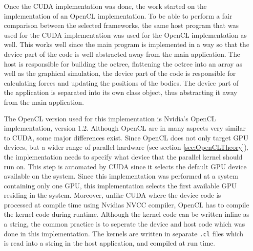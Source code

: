 Once the CUDA implementation was done, the work started on the implementation of an OpenCL implementation. To be able to perform a fair comparison between the selected frameworks, the same host program that was used for the CUDA implementation was used for the OpenCL implementation as well. This works well since the main program is implemented in a way so that the device part of the code is well abstracted away from the main application. The host is responsible for building the octree, flattening the octree into an array as well as the graphical simulation, the device part of the code is responsible for calculating forces and updating the positions of the bodies. The device part of the application is separated into its own class object, thus abstracting it away from the main application. 

The OpenCL version used for this implementation is Nvidia's OpenCL implementation, version 1.2.
Although OpenCL are in many aspects very similar to CUDA, some major differences exist. Since OpenCL does not only target GPU devices, but a wider range of parallel hardware (see section \ref{sec:OpenCLTheory}), the implementation needs to specify what device that the parallel kernel should run on. This step is automated by CUDA since it selects the default GPU device available on the system. Since this implementation was performed at a system containing only one GPU, this implementation selects the first available GPU residing in the system. Moreover, unlike CUDA where the device code is processed at compile time using Nvidias NVCC compiler, OpenCL has to compile the kernel code during runtime. Although the kernel code can be written inline as a string, the common practice is to seperate the device and host code which was done in this implementation. The kernels are written in separate \lstinline{.cl} files which is read into a string in the host application, and compiled at run time.

